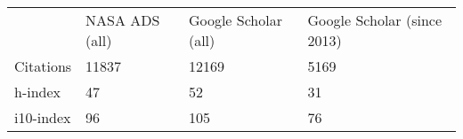 \begin{tabularx}{\textwidth}{llll}
	&NASA ADS (all) & Google Scholar (all) & Google Scholar (since 2013)\\ %
Citations& 11837& 12169&5169\\
h-index & 47 & 52 &31\\
i10-index & 96 &105&76\\
\end{tabularx}

